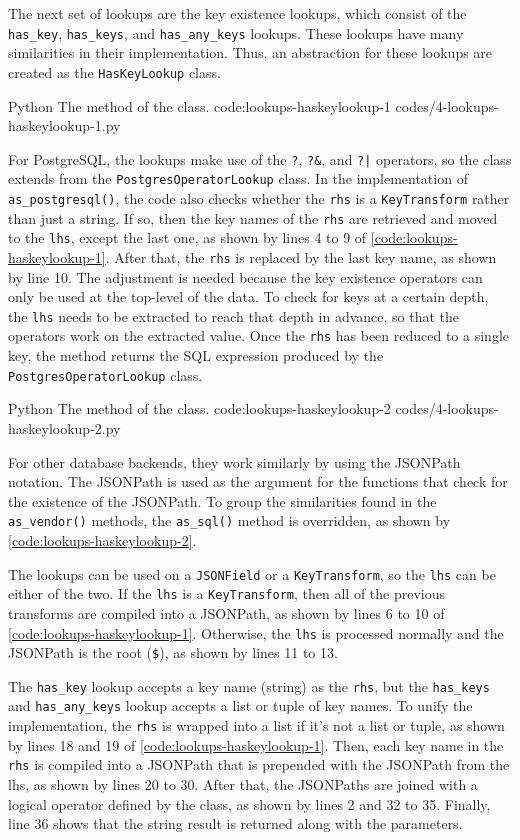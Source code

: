The next set of lookups are the key existence lookups, which consist of the
\verb|has_key|, \verb|has_keys|, and \verb|has_any_keys| lookups. These
lookups have many similarities in their implementation. Thus, an abstraction
for these lookups are created as the \verb|HasKeyLookup| class.

\listing
{Python}
{The  method of the  class.}
{code:lookups-haskeylookup-1}
{codes/4-lookups-haskeylookup-1.py}

For PostgreSQL, the lookups make use of the \verb|?|, \verb|?&|, and \verb=?|=
operators, so the class extends from the \verb|PostgresOperatorLookup| class.
In the implementation of \verb|as_postgresql()|, the code also checks whether
the \verb|rhs| is a \verb|KeyTransform| rather than just a string. If so, then
the key names of the \verb|rhs| are retrieved and moved to the \verb|lhs|,
except the last one, as shown by lines 4 to 9 of
\autoref{code:lookups-haskeylookup-1}. After that, the \verb|rhs| is replaced
by the last key name, as shown by line 10. The adjustment is needed because
the key existence operators can only be used at the top-level of the data. To
check for keys at a certain depth, the \verb|lhs| needs to be extracted to
reach that depth in advance, so that the operators work on the extracted value.
Once the \verb|rhs| has been reduced to a single key, the method returns the
SQL expression produced by the \verb|PostgresOperatorLookup| class.

\listing
{Python}
{The  method of the  class.}
{code:lookups-haskeylookup-2}
{codes/4-lookups-haskeylookup-2.py}

For other database backends, they work similarly by using the JSONPath
notation. The JSONPath is used as the argument for the functions that check for
the existence of the JSONPath. To group the similarities found in the
\verb|as_vendor()| methods, the \verb|as_sql()| method is overridden, as shown
by \autoref{code:lookups-haskeylookup-2}.

The lookups can be used on a \verb|JSONField| or a \verb|KeyTransform|, so the
\verb|lhs| can be either of the two. If the \verb|lhs| is a
\verb|KeyTransform|, then all of the previous transforms are compiled into a
JSONPath, as shown by lines 6 to 10 of \autoref{code:lookups-haskeylookup-1}.
Otherwise, the \verb|lhs| is processed normally and the JSONPath is the root
(\verb|$|), as shown by lines 11 to 13.

The \verb|has_key| lookup accepts a key name (string) as the \verb|rhs|, but
the \verb|has_keys| and \verb|has_any_keys| lookup accepts a list or tuple of
key names. To unify the implementation, the \verb|rhs| is wrapped into a list
if it's not a list or tuple, as shown by lines 18 and 19 of
\autoref{code:lookups-haskeylookup-1}. Then, each key name in the \verb|rhs| is
compiled into a JSONPath that is prepended with the JSONPath from the lhs, as
shown by lines 20 to 30. After that, the JSONPaths are joined with a logical
operator defined by the class, as shown by lines 2 and 32 to 35. Finally, line
36 shows that the string result is returned along with the parameters.

